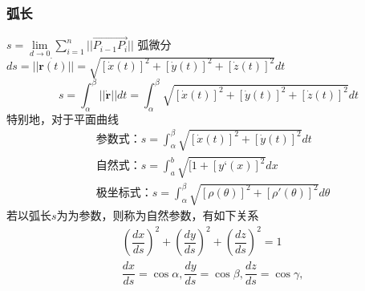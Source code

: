 \subsubsection{弧长}
$ s=\lim\limits_{d\to 0}\sum_{i=1}^{n}||\vec{P_{i-1}P_i}|| $
弧微分$ ds=||\dot{\bm{r}(t)}||=\sqrt{[\dot{x}(t)]^2+[\dot{y}(t)]^2+[\dot{z}(t)]^2}dt $
\begin{equation}\label{key}
	s=\int_{\alpha}^{\beta}||\dot{\bm{r}}||dt=\int_{\alpha}^{\beta}\sqrt{[\dot{x}(t)]^2+[\dot{y}(t)]^2+[\dot{z}(t)]^2}dt
\end{equation}
特别地，对于平面曲线
\begin{align}
	&\text{参数式：}s=\int_{\alpha}^{\beta}\sqrt{[\dot{x}(t)]^2+[\dot{y}(t)]^2}dt\\
	&\text{自然式：}s=\int_{a}^{b}\sqrt{[1+[y‘(x)]^2}dx\\
	&\text{极坐标式：}s=\int_{\alpha}^{\beta}\sqrt{[\rho(\theta)]^2+[\rho'(\theta)]^2}d\theta
\end{align}
若以弧长$ s $为为参数，则称为自然参数，有如下关系
\begin{align}
	&(\dfrac{dx}{ds})^2+(\dfrac{dy}{ds})^2+(\dfrac{dz}{ds})^2=1\\
	&\dfrac{dx}{ds}=\cos \alpha,\dfrac{dy}{ds}=\cos \beta,\dfrac{dz}{ds}=\cos \gamma,
\end{align}

